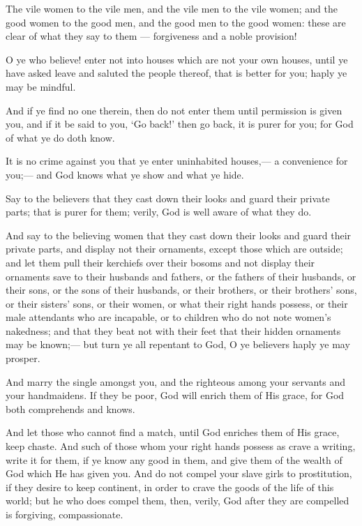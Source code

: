 \documentclass[fontsize=14pt, letterpaper, notitlepage, openany, DIV=12]{scrbook} %
\begin{document}
\noindent[24:26]
The vile women to the vile men, and the vile men to the vile women; and the good
women to the good men, and the good men to the good women: these are clear of what they say
to them --- forgiveness and a noble provision!

\noindent[24:27]
O ye who believe! enter not into houses which are not your own houses, until ye have
asked leave and saluted the people thereof, that is better for you; haply ye may be mindful.

\noindent[24:28]
And if ye find no one therein, then do not enter them until permission is given you, and if
it be said to you, `Go back!' then go back, it is purer for you; for God of what ye do doth know.

\noindent[24:29]
It is no crime against you that ye enter uninhabited houses,--- a convenience for you;---
and God knows what ye show and what ye hide.

\noindent[24:30]
Say to the believers that they cast down their looks and guard their private parts; that is
purer for them; verily, God is well aware of what they do.

\noindent[24:31]
And say to the believing women that they cast down their looks and guard their private
parts, and display not their ornaments, except those which are outside; and let them pull their
kerchiefs over their bosoms and not display their ornaments save to their husbands and fathers,
or the fathers of their husbands, or their sons, or the sons of their husbands, or their brothers, or
their brothers' sons, or their sisters' sons, or their women, or what their right hands possess, or
their male attendants who are incapable, or to children who do not note women's nakedness; and
that they beat not with their feet that their hidden ornaments may be known;--- but turn ye all
repentant to God, O ye believers haply ye may prosper.

\noindent[24:32]
And marry the single amongst you, and the righteous among your servants and your
handmaidens. If they be poor, God will enrich them of His grace, for God both comprehends and
knows.

\noindent[24:33]
And let those who cannot find a match, until God enriches them of His grace, keep
chaste. And such of those whom your right hands possess as crave a writing, write it for them, if
ye know any good in them, and give them of the wealth of God which He has given you. And do
not compel your slave girls to prostitution, if they desire to keep continent, in order to crave the
goods of the life of this world; but he who does compel them, then, verily, God after they are
compelled is forgiving, compassionate.
\end{document}
